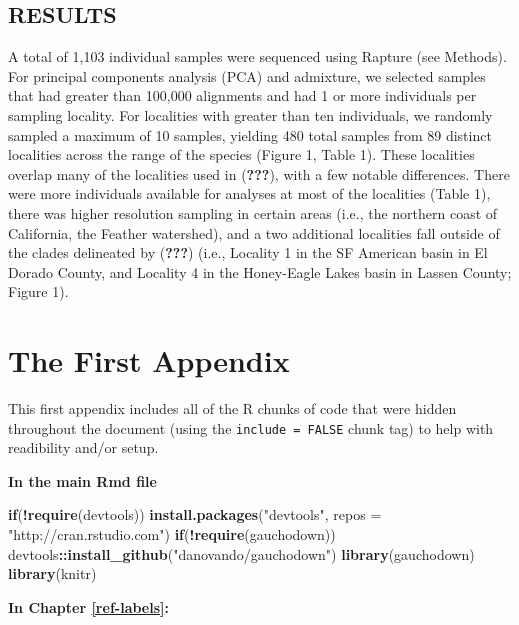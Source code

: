 \documentclass[proquest,12pt,final]{ucthesis-CA2012} %
\newenvironment{Shaded}{}{}
\newcommand{\KeywordTok}[1]{\textcolor[rgb]{0.00,0.44,0.13}{\textbf{{#1}}}}
\newcommand{\DataTypeTok}[1]{\textcolor[rgb]{0.56,0.13,0.00}{{#1}}}
\newcommand{\StringTok}[1]{\textcolor[rgb]{0.25,0.44,0.63}{{#1}}}
\newcommand{\NormalTok}[1]{{#1}}
\newcommand{\OperatorTok}[1]{\textcolor[rgb]{0.00,0.44,0.13}{\textbf{{#1}}}}
\newcommand{\ControlFlowTok}[1]{\textcolor[rgb]{0.00,0.44,0.13}{\textbf{{#1}}}}
\begin{document}
\begin{ucmainmatter}
\hypertarget{results-2}{%
\section{RESULTS}\label{results-2}}

A total of 1,103 individual samples were sequenced using Rapture (see
Methods). For principal components analysis (PCA) and admixture, we
selected samples that had greater than 100,000 alignments and had 1 or
more individuals per sampling locality. For localities with greater than
ten individuals, we randomly sampled a maximum of 10 samples, yielding
480 total samples from 89 distinct localities across the range of the
species (Figure 1, Table 1). These localities overlap many of the
localities used in ({\textbf{???}}), with a few notable differences.
There were more individuals available for analyses at most of the
localities (Table 1), there was higher resolution sampling in certain
areas (i.e., the northern coast of California, the Feather watershed),
and a two additional localities fall outside of the clades delineated by
({\textbf{???}}) (i.e., Locality 1 in the SF American basin in El Dorado
County, and Locality 4 in the Honey-Eagle Lakes basin in Lassen County;
Figure 1).

\appendix

\hypertarget{the-first-appendix}{%
\chapter{The First Appendix}\label{the-first-appendix}}

This first appendix includes all of the R chunks of code that were
hidden throughout the document (using the \texttt{include\ =\ FALSE}
chunk tag) to help with readibility and/or setup.

\textbf{In the main Rmd file}
\begin{Shaded}
\begin{Highlighting}[]
\ControlFlowTok{if}\NormalTok{(}\OperatorTok{!}\KeywordTok{require}\NormalTok{(devtools))}
  \KeywordTok{install.packages}\NormalTok{(}\StringTok{"devtools"}\NormalTok{, }\DataTypeTok{repos =} \StringTok{"http://cran.rstudio.com"}\NormalTok{)}
\ControlFlowTok{if}\NormalTok{(}\OperatorTok{!}\KeywordTok{require}\NormalTok{(gauchodown))}
\NormalTok{  devtools}\OperatorTok{::}\KeywordTok{install_github}\NormalTok{(}\StringTok{"danovando/gauchodown"}\NormalTok{)}
\KeywordTok{library}\NormalTok{(gauchodown)}
\KeywordTok{library}\NormalTok{(knitr)}
\end{Highlighting}
\end{Shaded}
\textbf{In Chapter \ref{ref-labels}:}


\end{ucmainmatter}
\end{document}
